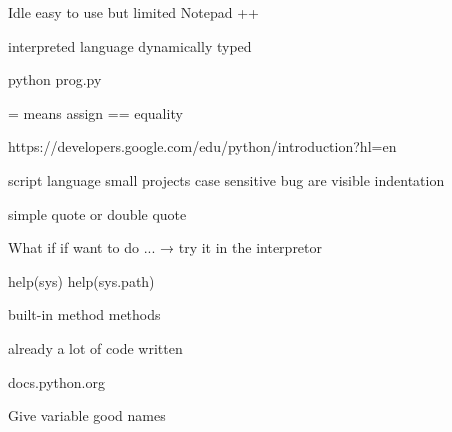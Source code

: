 Idle easy to use but limited
Notepad ++ 

 


interpreted language
dynamically typed


python prog.py

= means assign 
== equality


https://developers.google.com/edu/python/introduction?hl=en

script language
small projects
case sensitive
bug are visible
indentation

simple quote or double quote

What if if want to do ... → try it in the interpretor

help(sys)
help(sys.path)

built-in method methods

already a lot of code written


docs.python.org 


Give variable good names